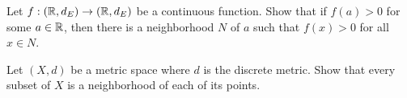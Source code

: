 \begin{comment}

\ExerciseSolution

\ba

\item Every ball is a neighborhood of each of its points, so $B(a,1)$ is a neighborhood of $a$ that contains $a$.

\item Since $N$ contains an open ball $B$ that contains $a$, we have that $B \subseteq N \subseteq M$ and $M$ contains an open ball that contains $a$. So $M$ is a neighborhood of $a$.

\item Suppose $M$ and $N$ are neighborhoods of $a$. Then there are open balls $B(a,m) \subseteq M$ and $B(a,n) \subseteq N$ for some positive real numbers $m$ and $n$. Then $B(a, \min\{m,n\}) \subseteq B(a,m) \cap B(a,n) \subseteq M \cap N$. Thus, $M \cap N$ is a neighborhood of $a$. 

\ea

\end{comment}
 
\item Let $f: (\mathbb{R},d_E) \to (\mathbb{R},d_E)$ be a continuous function. Show that if $f(a) > 0$ for some $a \in \mathbb{R}$, then there is a neighborhood $N$ of $a$ such that $f(x) > 0$ for all $x \in N$. 

\begin{comment}

\ExerciseSolution Assume that $f: (\R,d_E) \to (\R,d_E)$ is continuous and suppose $f(a) > 0$ for some $a \in \R$. There exists $\delta > 0$ such that $|x - a| < \delta$ implies $|f(x)-f(a)| < f(a)$. It follows that $-f(a) < f(x)-f(a) < f(a)$ or $0 < f(x) < 2f(a)$. Thus, $f(x) > 0$ for all $x$ in $B(a, \delta)$. 

\end{comment}

\item Let $(X,d)$ be a metric space where $d$ is the discrete metric. Show that every subset of $X$ is a neighborhood of each of its points.

\begin{comment}

\ExerciseSolution Let $A$ be a subset of $X$ and let $a \in A$. Since $B(a,1) = \{a\} \subseteq A$, we see that $A$ is a neighborhood of each of its points. 

\end{comment}

